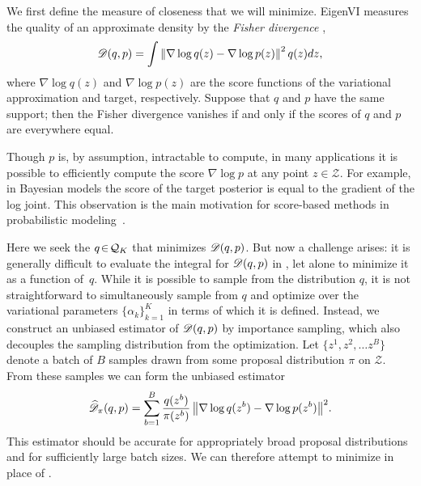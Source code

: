 We first define the measure of closeness that we will minimize.
EigenVI measures the quality of an approximate density by the
\textit{Fisher divergence} \citep{hyvarinen2005estimation},
\begin{align}
\label{eq-divergence}
    \mathscr{D}(q,p) = \int \left\lVert\nabla \log q(z) - \nabla\log p(z)\right\rVert^2 q(z) dz,
\end{align}
where $\nabla \log q(z)$ and $\nabla \log p(z)$ are the score functions of the
variational approximation and target, respectively. Suppose that $q$ and $p$ have the same support; then the Fisher divergence vanishes if and only if the scores of $q$ and $p$ are
everywhere equal.

Though $p$ is, by assumption, intractable to compute, in many applications it is
possible to efficiently compute the score $\nabla \log p$ at any point
$z\in\mathcal{Z}$. For example, in Bayesian models the score of the target
posterior is equal to the gradient of the log joint. This observation is the main
motivation for score-based methods in probabilistic
modeling~\citep{liu2016stein,yu2023semiimplicit,modi2023,cai2024}.

Here we seek the $q\!\in\!\mathcal{Q}_K$ that minimizes $\mathscr{D}(q,p)$. But now a
challenge arises: it is generally difficult to evaluate the integral
for $\mathscr{D}(q,p)$ in , let alone to minimize it as a
function of~$q$.
While it is possible to sample from the distribution $q$,
it is not straightforward to simultaneously sample from $q$ and optimize over the variational parameters $\{\alpha_k\}_{k=1}^K$ in terms of which it is defined.
Instead, we construct an unbiased estimator of
$\mathscr{D}(q,p)$ by importance sampling, which also decouples the sampling distribution from the optimization.
Let $\{z^1,z^2,\ldots z^B\}$ denote a
batch of $B$ samples drawn from some proposal distribution $\pi$ on
$\mathcal{Z}$. From these samples we can form the unbiased estimator
\begin{align}
  \label{eq-empirical-divergence}
  \widehat{\mathscr{D}}_{\pi}(q, p) =
  \sum_{b=1}^B \frac{q(z^b)}{\pi(z^b)} \, \big\|\nabla \log q(z^b) - \nabla\log p(z^b)\big\|^2.
\end{align}
This estimator should be accurate for appropriately broad proposal
distributions and for sufficiently large batch sizes. We can therefore
attempt to minimize  in place of
.

